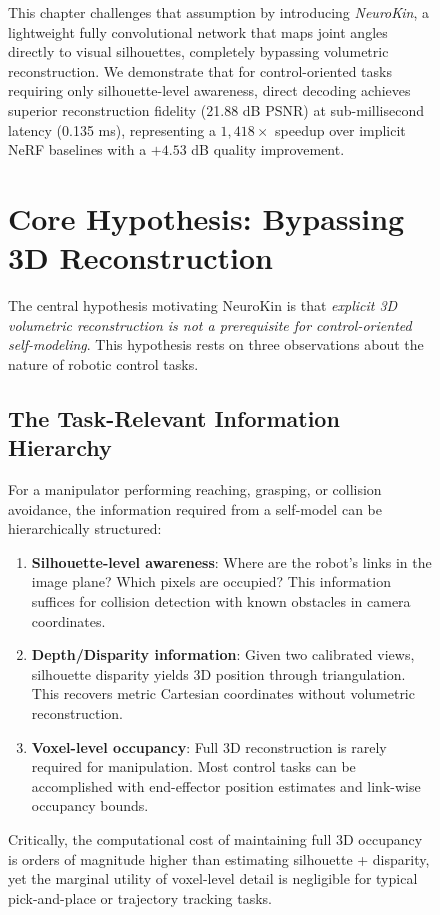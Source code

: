 \documentclass[12pt,a4paper,oneside]{report}
\begin{document}
\begin{figure}[H]
This chapter challenges that assumption by introducing \textit{NeuroKin}, a lightweight fully convolutional network that maps joint angles directly to visual silhouettes, completely bypassing volumetric reconstruction. We demonstrate that for control-oriented tasks requiring only silhouette-level awareness, direct decoding achieves superior reconstruction fidelity (21.88 dB PSNR) at sub-millisecond latency (0.135 ms), representing a $1,418\times$ speedup over implicit NeRF baselines with a $+4.53$ dB quality improvement.

\section{Core Hypothesis: Bypassing 3D Reconstruction}

The central hypothesis motivating NeuroKin is that \textit{explicit 3D volumetric reconstruction is not a prerequisite for control-oriented self-modeling}. This hypothesis rests on three observations about the nature of robotic control tasks.

\subsection{The Task-Relevant Information Hierarchy}

For a manipulator performing reaching, grasping, or collision avoidance, the information required from a self-model can be hierarchically structured:
\begin{enumerate}
    \item \textbf{Silhouette-level awareness}: Where are the robot's links in the image plane? Which pixels are occupied? This information suffices for collision detection with known obstacles in camera coordinates.
    \item \textbf{Depth/Disparity information}: Given two calibrated views, silhouette disparity yields 3D position through triangulation. This recovers metric Cartesian coordinates without volumetric reconstruction.
    \item \textbf{Voxel-level occupancy}: Full 3D reconstruction is rarely required for manipulation. Most control tasks can be accomplished with end-effector position estimates and link-wise occupancy bounds.
\end{enumerate}

Critically, the computational cost of maintaining full 3D occupancy is orders of magnitude higher than estimating silhouette + disparity, yet the marginal utility of voxel-level detail is negligible for typical pick-and-place or trajectory tracking tasks.


\end{figure}
\end{document}
